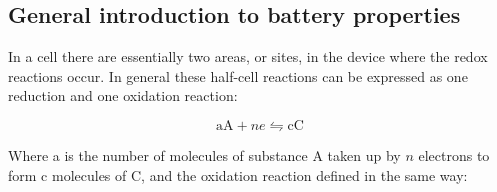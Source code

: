 






\subsection{General introduction to battery properties}\label{sec:msp}
	
	In a cell there are essentially two areas, or sites, in the device where the redox reactions occur. In general these half-cell reactions can be expressed as one reduction and one oxidation reaction:
	
	$$\text{aA} + ne \leftrightharpoons \text{cC} $$
	
	Where a is the number of molecules of substance A taken up by $n$ electrons to form c  molecules of C, and the oxidation reaction defined in the same way:
	

